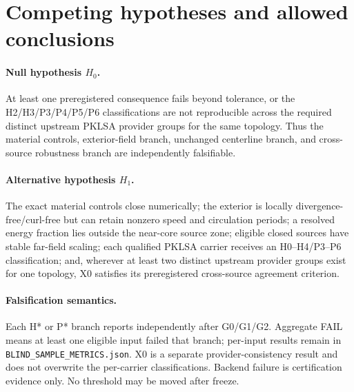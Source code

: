 \documentclass[11pt,a4paper]{article}
\begin{document}
\section{Competing hypotheses and allowed conclusions}
\paragraph{Null hypothesis $H_0$.}
At least one preregistered consequence fails beyond tolerance, or the H2/H3/P3/P4/P5/P6 classifications are not reproducible across the required distinct upstream PKLSA provider groups for the same topology. Thus the material controls, exterior-field branch, unchanged centerline branch, and cross-source robustness branch are independently falsifiable.

\paragraph{Alternative hypothesis $H_1$.}
The exact material controls close numerically; the exterior is locally divergence-free/curl-free but can retain nonzero speed and circulation periods; a resolved energy fraction lies outside the near-core source zone; eligible closed sources have stable far-field scaling; each qualified PKLSA carrier receives an H0--H4/P3--P6 classification; and, wherever at least two distinct upstream provider groups exist for one topology, X0 satisfies its preregistered cross-source agreement criterion.

\paragraph{Falsification semantics.}
Each H* or P* branch reports independently after G0/G1/G2. Aggregate FAIL means at least one eligible input failed that branch; per-input results remain in \texttt{BLIND\_SAMPLE\_METRICS.json}. X0 is a separate provider-consistency result and does not overwrite the per-carrier classifications. Backend failure is certification evidence only. No threshold may be moved after freeze.

\end{document}
